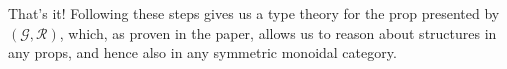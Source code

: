 \documentclass[pra,floatfix,
amsmath,superscriptaddress, 12pt]{article}
\theoremstyle{definition}
\newcommand{\fF}{\mathfrak{F}}
\newcommand{\cG}{\mathcal{G}}
\newcommand{\cR}{\mathcal{R}}
\newcommand{\Ob}{\mathsf{Ob}}
\newcommand{\mc}[1]{\mathcal{#1}}
\begin{document}

That's it! Following these steps gives us a type theory for the prop presented by $(\cG,\cR)$, which, as proven in the paper, allows us to reason about structures in any props, and hence also in any symmetric monoidal category.

\end{document}
